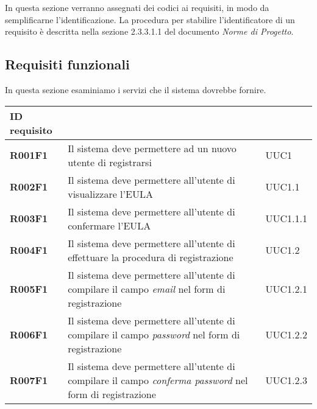 \documentclass[../analisi-dei-requisiti]{subfiles}
\begin{document}
In questa sezione verranno assegnati dei codici ai requisiti, in modo da semplificarne l’identificazione. La procedura per stabilire l'identificatore di un requisito è descritta nella sezione 2.3.3.1.1 del documento \textit{Norme di Progetto}.

\subsection{Requisiti funzionali}%
\label{sub:requisiti_funzionali}
In questa sezione esaminiamo i servizi che il sistema dovrebbe fornire.

\centering
{}
\renewcommand{\arraystretch}{2} %
\begin{longtable}[H]{>{\centering\bfseries}m{3cm} >{\centering}m{10cm} >{\centering\arraybackslash}m{3cm}}
  \rowcolor{darkgray!90!}
  \color{white}
  {\textbf{ID requisito}} & \color{white}{\textbf{Descrizione}}                                                                               & \color{white}{\textbf{Fonte}} \\
  \endhead
  R001F1                  & Il sistema deve permettere ad un nuovo utente di registrarsi                                                      & UUC1                          \\
  R002F1                  & Il sistema deve permettere all'utente di visualizzare l'EULA                                                      & UUC1.1                        \\
  R003F1                  & Il sistema deve permettere all'utente di confermare l'EULA                                                        & UUC1.1.1                      \\
  R004F1                  & Il sistema deve permettere all'utente di effettuare la procedura di registrazione                                 & UUC1.2                        \\
  R005F1                  & Il sistema deve permettere all'utente di compilare il campo \textit{email} nel form di registrazione              & UUC1.2.1                      \\
  R006F1                  & Il sistema deve permettere all'utente di compilare il campo \textit{password} nel form di registrazione           & UUC1.2.2                      \\
  R007F1                  & Il sistema deve permettere all'utente di compilare il campo \textit{conferma password} nel form di registrazione  & UUC1.2.3                      \\

\end{longtable}
\end{document}
